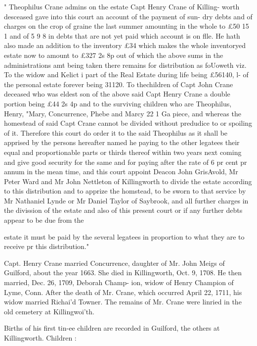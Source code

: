 \documentclass[oneside]{book}
\begin{document}
" Theophilus Crane admins on the estate Capt Henry Crane of Killing- 
worth desceased gave into this court an account of the payment of sun- 
dry debts and of charges on the crop of graine the last summer amounting 
in the whole to £50  15  1 and of 5  9  8 in debts that are not yet paid 
which account is on flle. He hath also made an addition to the inventory 
£34 which makes the whole inventoryed estate now to amount to £327  
2s  8p out of which the above sums in the administrations amt being 
taken there remains for distribution as foUoweth viz. To the widow and 
Kelict i part of the Real Estate during life being £56140, l- of the 
personal estate forever being 31120. To thechildren of Capt John 
Crane deceased who was eldest son of the above said Capt Henry Crane 
a double portion being £44  2s  4p and to the surviving children who are 
Theophilus, Henry, "Mary, Concurrence, Phebe and Marcy 22  1  Ga 
piece, and whereas the homestead of said Capt Crane cannot be divided 
without predudice to or spoiling of it. Therefore this court do order it 
to the said Theophilus as it shall be apprised by the persons hereafter 
named he paying to the other legatees their equal and proportionable 
parts or thirds thereof within two years next coming and give good 
security for the same and for paying after the rate of 6 pr cent pr 
annum in the mean time, and this court appoint Deacon John GrisAvold, 
Mr Peter Ward and Mr John Nettleton of Killingworth to divide the 
estate according to this distribution and to apprize the homstead, to be 
sworn to that service by Mr Nathaniel Lynde or Mr Daniel Taylor of 
Saybrook, and all further charges in the divission of the estate and also 
of this present court or if any further debts appear to be due from the 




estate it must be paid by the several legatees in proportion to what they 
are to receive pr this distribution." 

Capt. Henry Crane married Concurrence, daughter of Mr. John 
Meigs of Guilford, about the year 1663. She died in Killingworth, 
Oct. 9, 1708. He then married, Dec. 26, 1709, Deborah Champ- 
ion, widow of Henry Champion of Lyme, Conn. After the death 
of Mr. Crane, which occurred April 22, 1711, his widow married 
Richai'd Towner. The remains of Mr. Crane were linried in the 
old cemetery at Killingwoi'th. 

Births of his first tin-ee children are recorded in Guilford, the 
others at Killingworth. Children : 
\end{document}
